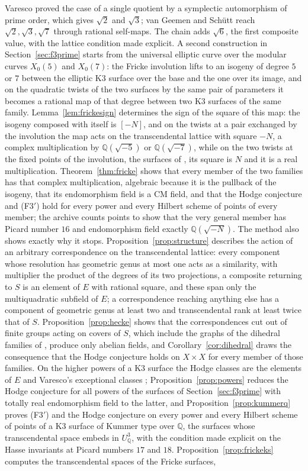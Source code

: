 \documentclass[11pt,reqno]{amsart}
\numberwithin{equation}{section}
\theoremstyle{plain}
\theoremstyle{definition}
\newcommand{\QQ}{\mathbb{Q}}
\newcommand{\Fiii}{\texorpdfstring{\textup{(F3$'$)}}{(F3')}}
\begin{document}
Varesco \cite{Var23} proved the case of a single quotient by a symplectic automorphism of prime order, which gives $\sqrt2$ and $\sqrt3$; van Geemen and Sch\"utt \cite{vGS25} reach $\sqrt2,\sqrt3,\sqrt7$ through rational self-maps. The chain adds $\sqrt6$, the first composite value, with the lattice condition made explicit. A second construction in Section~\ref{sec:f3prime} starts from the universal elliptic curve over the modular curves $X_{0}(5)$ and $X_{0}(7)$: the Fricke involution lifts to an isogeny of degree $5$ or $7$ between the elliptic K3 surface over the base and the one over its image, and on the quadratic twists of the two surfaces by the same pair of parameters it becomes a rational map of that degree between two K3 surfaces of the same family. Lemma~\ref{lem:frickesign} determines the sign of the square of this map: the isogeny composed with itself is $[-N]$, and on the twists at a pair exchanged by the involution the map acts on the transcendental lattice with square $-N$, a complex multiplication by $\QQ(\sqrt{-5})$ or $\QQ(\sqrt{-7})$, while on the two twists at the fixed points of the involution, the surfaces of \cite{vGS25}, its square is $N$ and it is a real multiplication. Theorem~\ref{thm:fricke} shows that every member of the two families has that complex multiplication, algebraic because it is the pullback of the isogeny, that its endomorphism field is a CM field, and that the Hodge conjecture and \Fiii{} hold for every power and every Hilbert scheme of points of every member; the archive counts points to show that the very general member has Picard number $16$ and endomorphism field exactly $\QQ(\sqrt{-N})$. The method also shows exactly why it stops. Proposition~\ref{prop:structure} describes the action of an arbitrary correspondence on the transcendental lattice: every component whose resolution has geometric genus at most one acts as a similarity, with multiplier the product of the degrees of its two projections, a composite returning to $S$ is an element of $E$ with rational square, and these span only the multiquadratic subfield of $E$; a correspondence reaching anything else has a component of geometric genus at least two and transcendental rank at least twice that of $S$. Proposition~\ref{prop:hecke} shows that the correspondences cut out of finite groups acting on covers of $S$, which include the graphs of the dihedral families of \cite{vGS25}, produce only abelian fields, and Corollary~\ref{cor:dihedral} draws the consequence that the Hodge conjecture holds on $X\times X$ for every member of those families. On the higher powers of a K3 surface the Hodge classes are the elements of $E$ and Varesco's exceptional classes \cite{Var25}; Proposition~\ref{prop:powers} reduces the Hodge conjecture for all powers of the surfaces of Section~\ref{sec:f3prime} with totally real endomorphism field to the latter, and Proposition~\ref{prop:kummerq} proves \Fiii{} and the Hodge conjecture on every power and every Hilbert scheme of points of a K3 surface of Kummer type over $\QQ$, the surfaces whose transcendental space embeds in $U_{\QQ}^{3}$, with the condition made explicit on the Hasse invariants at Picard numbers $17$ and $18$. Proposition~\ref{prop:frickeks} computes the transcendental spaces of the Fricke surfaces, 
\end{document}
